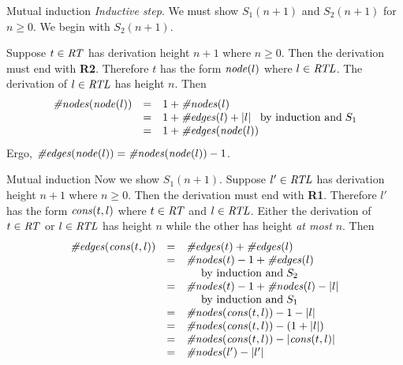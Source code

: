 \documentclass[style=sailor,size=12pt]{powerdot}
\begin{document}
\begin{wideslide}[bm=,toc=]{Mutual induction}
{\em Inductive step}.
We must show $S_1(n+1)$ and $S_2(n+1)$ for $n\geq 0$.
We begin with $S_2(n+1)$.

\vspace{1em}
Suppose $t\in\mbox{\it RT\/}$ has derivation height $n+1$ where $n\geq 0$.
Then the derivation must end with {\bf R2}. 
Therefore $t$ has the form $\mbox{\it node\/}(l)$
where $l\in\mbox{\it RTL\/}$.
The derivation of $l\in\mbox{\it RTL\/}$ has height $n$.
Then
\begin{displaymath}
\begin{array}{lll}
\mbox{\it \#nodes\/}(\mbox{\it node\/}(l)) & = & 1 + \mbox{\it \#nodes\/}(l) \\
	& = & 1+\mbox{\it \#edges\/}(l) + |l|\;\;\;\mbox{\rm by induction and}\;S_1 \\
	& = & 1+\mbox{\it \#edges\/}(\mbox{\it node\/}(l))
\end{array}
\end{displaymath}
Ergo, $\mbox{\it \#edges\/}(\mbox{\it node\/}(l))=\mbox{\it \#nodes\/}(\mbox{\it node\/}(l))-1$.
\end{wideslide}

\begin{wideslide}[bm=,toc=]{Mutual induction}
Now we show $S_1(n+1)$.
Suppose $l'\in\mbox{\it RTL\/}$ has derivation height $n+1$ where $n\geq 0$.
Then the derivation must end with {\bf R1}. 
Therefore $l'$ has the form $\mbox{\it cons\/}(t,l)$
where $t\in\mbox{\it RT\/}$ and $l\in\mbox{\it RTL\/}$.
Either the derivation of $t\in\mbox{\it RT\/}$ or $l\in\mbox{\it RTL\/}$ has height $n$ while the other 
has height {\em at most\/} $n$.
Then
\begin{displaymath}
\begin{array}{lll}
\mbox{\it \#edges\/}(\mbox{\it cons\/}(t,l)) & = & \mbox{\it \#edges\/}(t) + \mbox{\it \#edges\/}(l) \\
	& = & \mbox{\it \#nodes\/}(t) - 1 + \mbox{\it \#edges\/}(l) \\
 & & \>\>\>\>\>\>\mbox{\rm by induction and}\;S_2 \\
	& = & \mbox{\it \#nodes\/}(t) - 1 + \mbox{\it \#nodes\/}(l) - |l| \\
 & & \>\>\>\>\>\>\mbox{\rm by induction and}\;S_1 \\
	& = & \mbox{\it \#nodes\/}(\mbox{\it cons\/}(t,l)) - 1 - |l| \\
	& = & \mbox{\it \#nodes\/}(\mbox{\it cons\/}(t,l)) - (1 + |l|) \\
	& = & \mbox{\it \#nodes\/}(\mbox{\it cons\/}(t,l)) - |\mbox{\it cons\/}(t,l)|\\
	& = & \mbox{\it \#nodes\/}(l') - |l'|
\end{array}
\end{displaymath}
\end{wideslide}
\end{document}
